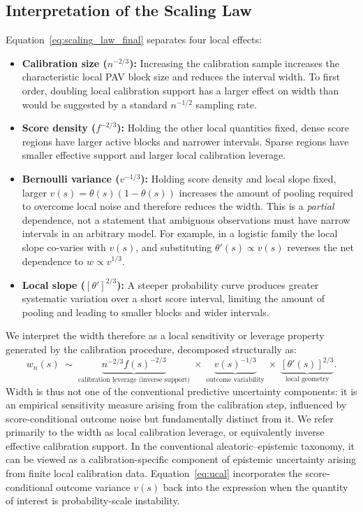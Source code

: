 \documentclass[11pt]{article}
\begin{document}
	\subsection{Interpretation of the Scaling Law}
	
	Equation~\ref{eq:scaling_law_final} separates four local effects:
	\begin{itemize}
		\item \textbf{Calibration size ($n^{-2/3}$):} Increasing the calibration sample increases the characteristic local PAV block size and reduces the interval width. To first order, doubling local calibration support has a larger effect on width than would be suggested by a standard $n^{-1/2}$ sampling rate.
		\item \textbf{Score density ($f^{-2/3}$):} Holding the other local quantities fixed, dense score regions have larger active blocks and narrower intervals. Sparse regions have smaller effective support and larger local calibration leverage.
		\item \textbf{Bernoulli variance ($v^{-1/3}$):} Holding score density and local slope fixed, larger $v(s)=\theta(s)(1-\theta(s))$ increases the amount of pooling required to overcome local noise and therefore reduces the width. This is a \emph{partial} dependence, not a statement that ambiguous observations must have narrow intervals in an arbitrary model. For example, in a logistic family the local slope co-varies with $v(s)$, and substituting $\theta'(s)\propto v(s)$ reverses the net dependence to $w\propto v^{1/3}$.
		\item \textbf{Local slope ($[\theta']^{2/3}$):} A steeper probability curve produces greater systematic variation over a short score interval, limiting the amount of pooling and leading to smaller blocks and wider intervals.
	\end{itemize}
	
	We interpret the width therefore as a local sensitivity or leverage property generated by the calibration procedure, decomposed structurally as:
	\begin{equation}
		w_n(s) \;\sim\; \underbrace{n^{-2/3}f(s)^{-2/3}}_{\text{calibration leverage (inverse support)}} \;\times\; \underbrace{v(s)^{-1/3}}_{\text{outcome variability}} \;\times\; \underbrace{[\theta'(s)]^{2/3}}_{\text{local geometry}}.
		\label{eq:scaling_decomp}
	\end{equation}
	Width is thus not one of the conventional predictive uncertainty components: it is an empirical sensitivity measure arising from the calibration step, influenced by score-conditional outcome noise but fundamentally distinct from it. We refer primarily to the width as local calibration leverage, or equivalently inverse effective calibration support. In the conventional aleatoric--epistemic taxonomy, it can be viewed as a calibration-specific component of epistemic uncertainty arising from finite local calibration data. Equation~\ref{eq:ucal} incorporates the score-conditional outcome variance $v(s)$ back into the expression when the quantity of interest is probability-scale instability.
\end{document}
